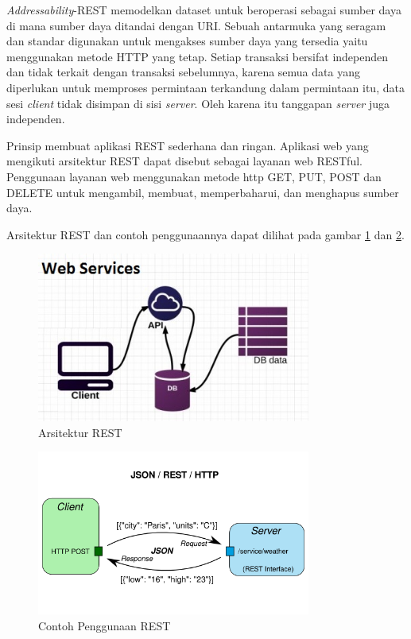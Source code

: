 			\textit{Addressability}-REST memodelkan dataset untuk beroperasi sebagai sumber daya di mana sumber daya ditandai dengan URI. Sebuah antarmuka yang seragam dan standar digunakan untuk mengakses sumber daya yang tersedia yaitu menggunakan metode HTTP yang tetap. Setiap transaksi bersifat independen dan tidak terkait dengan transaksi sebelumnya, karena semua
			data yang diperlukan untuk memproses permintaan terkandung dalam permintaan itu, data sesi \textit{client} tidak disimpan di sisi \textit{server}. Oleh karena itu tanggapan \textit{server} juga independen. 
			
			Prinsip membuat aplikasi REST sederhana dan ringan. Aplikasi web yang mengikuti arsitektur REST dapat disebut sebagai layanan web RESTful. Penggunaan layanan web menggunakan metode http GET, PUT, POST dan DELETE untuk mengambil, membuat, memperbaharui, dan menghapus sumber daya.
			
			Arsitektur REST dan contoh penggunaannya dapat dilihat pada gambar \ref{rest} dan \ref{rest2}.
			\begin{figure}[H]
				\centering
				\includegraphics[width=9cm]{Images/C-2/rest-api.jpg}
				\caption{Arsitektur REST}
				\label{rest}
			\end{figure}
			\begin{figure}[H]
				\centering
				\includegraphics[width=9cm]{Images/C-2/rest.png}
				\caption{Contoh Penggunaan REST}
				\label{rest2}
			\end{figure}
			